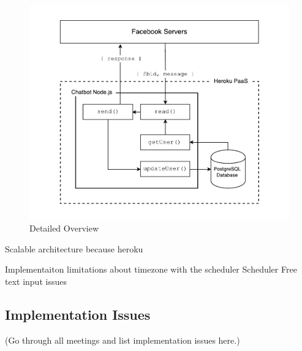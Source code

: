 \begin{figure}[H]
    \centering
    \includegraphics[width=6in]{../resources/diagrams/chatbot-detailed-overview.pdf}
    \caption{Detailed Overview}
    \label{fig:prototype_detailed_overview}
\end{figure}

Scalable architecture because heroku\newline

Implementaiton limitations about timezone with the scheduler\newline
Scheduler\newline
Free text input issues\newline

\subsection{Implementation Issues}
(Go through all meetings and list implementation issues here.)

